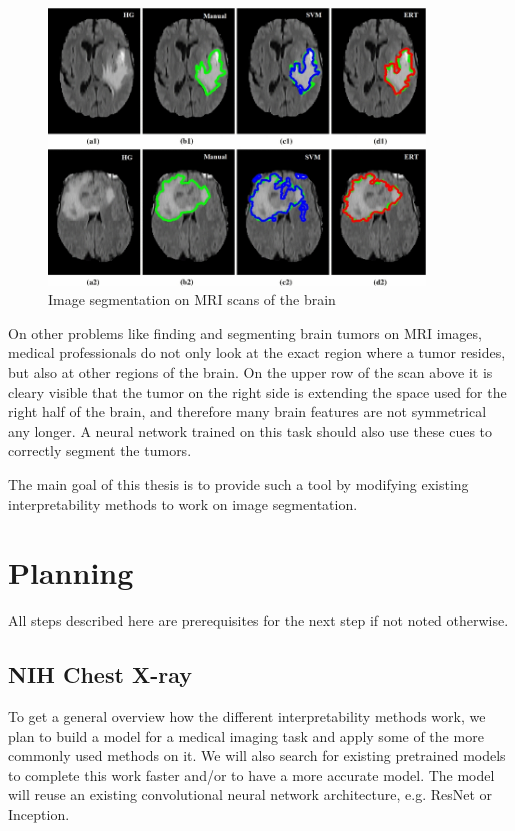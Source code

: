 \begin{figure}[H]
\centering
\caption{Image segmentation on MRI scans of the brain\cite{soltaninejad2017automated}}
\includegraphics[width=10cm]{images/brain_segmentation.jpg}
\end{figure}

On other problems like finding and segmenting brain tumors on MRI images, medical professionals do not only look at the exact region where a tumor resides, but also at other regions of the brain. On the upper row of the scan above it is cleary visible that the tumor on the right side is extending the space used for the right half of the brain, and therefore many brain features are not symmetrical any longer. A neural network trained on this task should also use these cues to correctly segment the tumors. 

The main goal of this thesis is to provide such a tool by modifying existing interpretability methods to work on image segmentation.

\section{Planning}
All steps described here are prerequisites for the next step if not noted otherwise.

\subsection{NIH Chest X-ray}
To get a general overview how the different interpretability methods work, we plan to build a model for a medical imaging task and apply some of the more commonly used methods on it. We will also search for existing pretrained models to complete this work faster and/or to have a more accurate model. The model will reuse an existing convolutional neural network architecture, e.g. ResNet or Inception.

